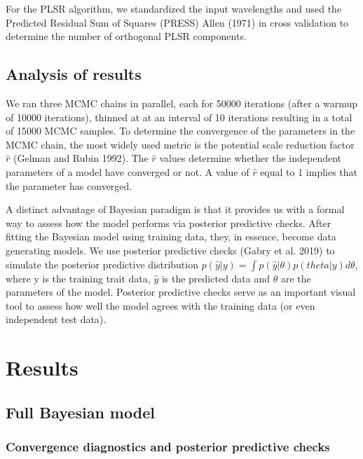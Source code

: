 \documentclass[
  letterpaper,
  DIV=11,
  numbers=noendperiod]{scrartcl}
\begin{document}
For the PLSR algorithm, we standardized the input wavelengths and used
the Predicted Residual Sum of Squares (PRESS) Allen (1971) in cross
validation to determine the number of orthogonal PLSR components.

\hypertarget{analysis-of-results}{%
\subsection{Analysis of results}\label{analysis-of-results}}

We ran three MCMC chains in parallel, each for 50000 iterations (after a
warmup of 10000 iterations), thinned at at an interval of 10 iterations
resulting in a total of 15000 MCMC samples. To determine the convergence
of the parameters in the MCMC chain, the most widely used metric is the
potential scale reduction factor \(\hat{r}\) (Gelman and Rubin 1992).
The \(\hat{r}\) values determine whether the independent parameters of a
model have converged or not. A value of \(\hat{r}\) equal to 1 implies
that the parameter has converged.

A distinct advantage of Bayesian paradigm is that it provides us with a
formal way to assess how the model performs via posterior predictive
checks. After fitting the Bayesian model using training data, they, in
essence, become data generating models. We use posterior predictive
checks (Gabry et al. 2019) to simulate the posterior predictive
distribution
\(p(\hat{y}|y) = \int p(\hat{y}|\theta) p(theta|y) d\theta\), where y is
the training trait data, \(\hat{y}\) is the predicted data and
\(\theta\) are the parameters of the model. Posterior predictive checks
serve as an important visual tool to assess how well the model agrees
with the training data (or even independent test data).

\hypertarget{results}{%
\section{Results}\label{results}}

\hypertarget{full-bayesian-model}{%
\subsection{Full Bayesian model}\label{full-bayesian-model}}

\hypertarget{convergence-diagnostics-and-posterior-predictive-checks}{%
\subsubsection{Convergence diagnostics and posterior predictive
checks}\label{convergence-diagnostics-and-posterior-predictive-checks}}
\end{document}
